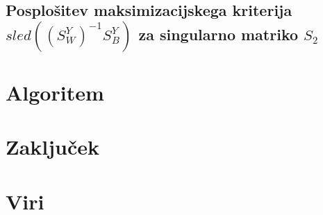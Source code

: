 \documentclass[mat1]{article}
\begin{document}
\subsection{Posplošitev maksimizacijskega kriterija $sled((S_W^Y)^{-1}S_B^Y)$ za singularno matriko $S_2$}

\section{Algoritem}

\section{Zaključek}

\section{Viri}
\end{document}
